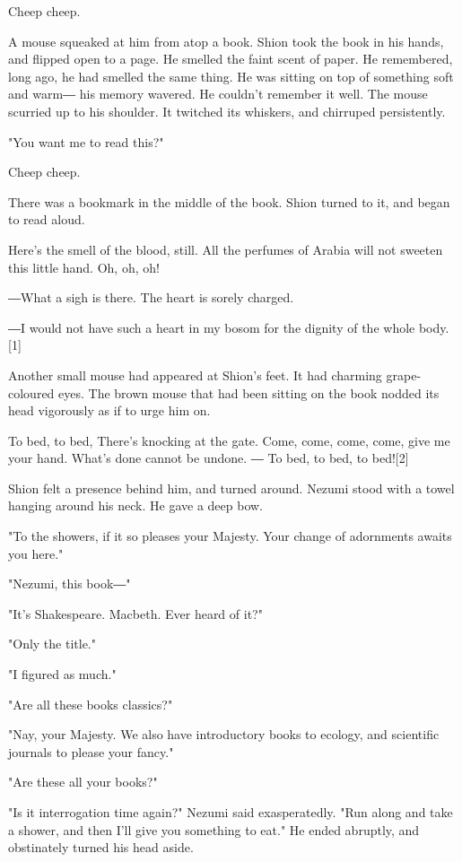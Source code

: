 Cheep cheep.

A mouse squeaked at him from atop a book. Shion took the book in his
hands, and flipped open to a page. He smelled the faint scent of paper.
He remembered, long ago, he had smelled the same thing. He was sitting
on top of something soft and warm― his memory wavered. He couldn't
remember it well. The mouse scurried up to his shoulder. It twitched its
whiskers, and chirruped persistently.

"You want me to read this?"

Cheep cheep.

There was a bookmark in the middle of the book. Shion turned to it, and
began to read aloud.

Here's the smell of the blood, still. All the perfumes of Arabia will
not sweeten this little hand. Oh, oh, oh!

―What a sigh is there. The heart is sorely charged.

―I would not have such a heart in my bosom for the dignity of the whole
body.{[}1{]}

Another small mouse had appeared at Shion's feet. It had charming
grape-coloured eyes. The brown mouse that had been sitting on the book
nodded its head vigorously as if to urge him on.

To bed, to bed, There's knocking at the gate. Come, come, come, come,
give me your hand. What's done cannot be undone. ― To bed, to bed, to
bed!{[}2{]}

Shion felt a presence behind him, and turned around. Nezumi stood with a
towel hanging around his neck. He gave a deep bow.

"To the showers, if it so pleases your Majesty. Your change of
adornments awaits you here."

"Nezumi, this book―"

"It's Shakespeare. Macbeth. Ever heard of it?"

"Only the title."

"I figured as much."

"Are all these books classics?"

"Nay, your Majesty. We also have introductory books to ecology, and
scientific journals to please your fancy."

"Are these all your books?"

"Is it interrogation time again?" Nezumi said exasperatedly. "Run along
and take a shower, and then I'll give you something to eat." He ended
abruptly, and obstinately turned his head aside.


